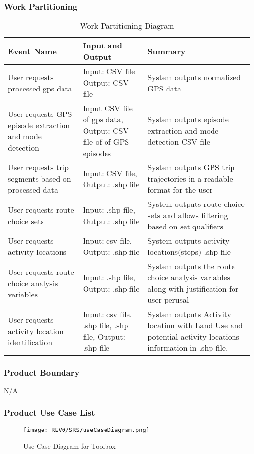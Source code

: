 \documentclass[12pt, titlepage]{article}
\begin{document}
\subsubsection{Work Partitioning}
\begin{table}[H]
    \centering
    \begin{tabular}{|p{4cm}|p{4cm}|p{6cm}|}
         \hline
         Event Name & Input and Output & Summary\\
         \hline
         User requests processed gps data & Input: CSV file Output: CSV file & System outputs normalized GPS data\\
         \hline
         User requests GPS episode extraction and mode detection & Input CSV file of gps data, Output: CSV file of of GPS episodes & System outputs episode extraction and mode detection CSV file\\
         \hline
         User requests trip segments based on processed data & Input: CSV file, Output: .shp file & System outputs GPS trip trajectories in a readable format for the user\\
         \hline
         User requests route choice sets & Input: .shp file, Output: .shp file & System outputs route choice sets and allows filtering based on set qualifiers\\
         \hline
         User requests activity locations  & Input: csv file, Output: .shp file & System outputs activity locations(stops) .shp file\\
         \hline
         User requests route choice analysis variables  & Input: .shp file, Output: .shp file & System outputs the route choice analysis variables along with justification for user perusal \\
         \hline
          User requests activity location identification  & Input: csv file, .shp file, .shp file, Output: .shp file& System outputs Activity location with Land Use and potential activity locations information in .shp file. \\
         \hline
    \end{tabular}
    \caption{Work Partitioning Diagram}
    \label{tab:team_roles}
\end{table}

\subsubsection{Product Boundary}

N/A

\subsubsection{Product Use Case List}
\begin{figure}[H]
	    \begin{center}
    	    \texttt{[image: REV0/SRS/useCaseDiagram.png]}
    	    \caption{Use Case Diagram for Toolbox}
    	    \label{fig:Toolbox Use Case Diagram}
    	\end{center}
\end{figure}
\end{document}
